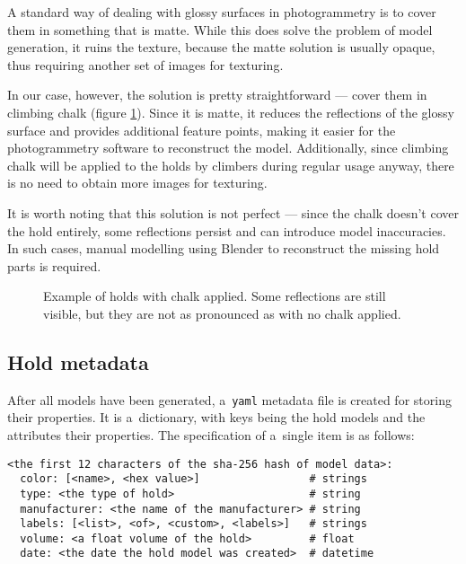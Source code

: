 A standard way of dealing with glossy surfaces in photogrammetry is to cover them in something that is matte.
While this does solve the problem of model generation, it ruins the texture, because the matte solution is usually opaque, thus requiring another set of images for texturing.

In our case, however, the solution is pretty straightforward --- cover them in climbing chalk (figure \ref{fig:chalk}).
Since it is matte, it reduces the reflections of the glossy surface and provides additional feature points, making it easier for the photogrammetry software to reconstruct the model.
Additionally, since climbing chalk will be applied to the holds by climbers during regular usage anyway, there is no need to obtain more images for texturing.

It is worth noting that this solution is not perfect --- since the chalk doesn't cover the hold entirely, some reflections persist and can introduce model inaccuracies.
In such cases, manual modelling using Blender \cite{blender} to reconstruct the missing hold parts is required.

\begin{figure}[t]
	\centering
	\hfill
	\hfill
	\caption{Example of holds with chalk applied. Some reflections are still visible, but they are not as pronounced as with no chalk applied.}%
	\label{fig:chalk}
\end{figure}

\subsection{Hold metadata}
After all models have been generated, a~\verb|yaml| metadata file is created for storing their properties.
It is a~dictionary, with keys being the hold models and the attributes their properties.
The specification of a~single item is as follows:

\begin{verbatim}
<the first 12 characters of the sha-256 hash of model data>:
  color: [<name>, <hex value>]                 # strings
  type: <the type of hold>                     # string
  manufacturer: <the name of the manufacturer> # string
  labels: [<list>, <of>, <custom>, <labels>]   # strings
  volume: <a float volume of the hold>         # float
  date: <the date the hold model was created>  # datetime
\end{verbatim}

